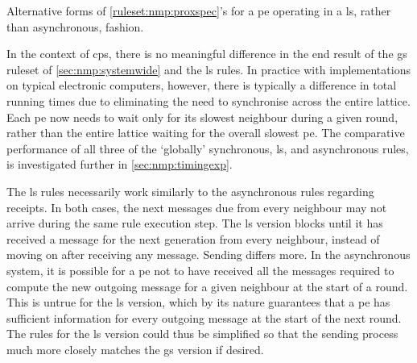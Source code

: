 \begin{cprulesetfloat}
    \begin{cpruleset}
    
        
        
        
    \end{cpruleset}
    \caption[Alternative forms of \cref{ruleset:nmp:proxspec}'s Rule 10]{\label{ruleset:nmp:localsync}Alternative forms of \cref{ruleset:nmp:proxspec}'s  for a \gls{pe} operating in a \gls{ls}, rather than asynchronous, fashion.}
\end{cprulesetfloat}

In the context of \gls{cps}, there is no meaningful difference in the end result of the \gls{gs} \gls{ruleset} of \cref{sec:nmp:systemwide} and the \gls{ls} rules.  In practice with implementations on typical electronic computers, however, there is typically a difference in total running times due to eliminating the need to synchronise across the entire lattice.  Each \gls{pe} now needs to wait only for its slowest neighbour during a given round, rather than the entire lattice waiting for the overall slowest \gls{pe}.  The comparative performance of all three of the `globally' synchronous, \gls{ls}, and asynchronous rules, is investigated further in \cref{sec:nmp:timingexp}.

The \gls{ls} rules necessarily work similarly to the asynchronous rules regarding receipts.  In both cases, the next messages due from every neighbour may not arrive during the same rule execution step.  The \gls{ls} version blocks until it has received a message for the next generation from every neighbour, instead of moving on after receiving any message.  Sending differs more.  In the asynchronous system, it is possible for a \gls{pe} not to have received all the messages required to compute the new outgoing message for a given neighbour at the start of a round.  This is untrue for the \gls{ls} version, which by its nature guarantees that a \gls{pe} has sufficient information for every outgoing message at the start of the next round.  The rules for the \gls{ls} version could thus be simplified so that the sending process much more closely matches the \gls{gs} version if desired.

